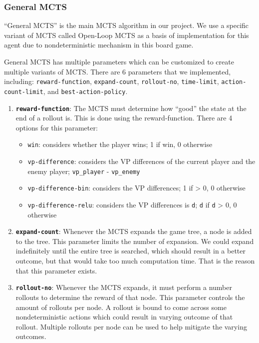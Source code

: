 \subsubsection{General MCTS}
``General MCTS'' is the main MCTS algorithm in our project. We use a specific variant of MCTS called Open-Loop MCTS as a basis of implementation for this agent due to nondeterministic mechanism in this board game.

General MCTS has multiple parameters which can be customized to create multiple variants of MCTS. There are 6 parameters that we implemented, including: \texttt{reward-function}, \texttt{expand-count}, \texttt{rollout-no}, \texttt{time-limit}, \texttt{action-count-limit}, and \texttt{best-action-policy}.

\begin{enumerate}
  \item \textbf{\texttt{reward-function}}: The MCTS must determine how ``good'' the state at the end of a rollout is. This is done using the reward-function. There are 4 options for this parameter:
  \begin{itemize}
    \item \texttt{win}: considers whether the player wins; 1 if win, 0 otherwise
    \item \texttt{vp-difference}: considers the VP differences of the current player and the enemy player; \texttt{vp\_player} - \texttt{vp\_enemy}
    \item \texttt{vp-difference-bin}: considers the VP differences; 1 if > 0,  0 otherwise
    \item \texttt{vp-difference-relu}: considers the VP differences is \texttt{d}; \texttt{d} if \texttt{d} > 0, 0 otherwise  
  \end{itemize}
  \item \textbf{\texttt{expand-count}}: Whenever the MCTS expands the game tree, a node is added to the tree. This parameter limits the number of expansion. We could expand indefinitely until the entire tree is searched, which should result in a better outcome, but that would take too much computation time. That is the reason that this parameter exists.
  \item \textbf{\texttt{rollout-no}}: Whenever the MCTS expands, it must perform a number rollouts to determine the reward of that node. This parameter controls the amount of rollouts per node. A rollout is bound to come across some nondeterministic actions which could result in varying outcome of that rollout. Multiple rollouts per node can be used to help mitigate the varying outcomes.

\end{enumerate}
